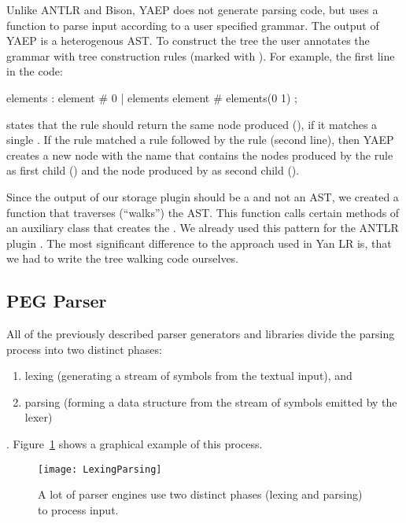 Unlike \gls{ANTLR} and Bison, \gls{YAEP} does not generate parsing code, but uses a function to parse input according to a user specified grammar. The output of YAEP is a heterogenous \gls{AST}. To construct the tree the user annotates the grammar with tree construction rules (marked with \code{\#}). For example, the first line in the code:

\begin{shellcode}
elements : element          # 0
         | elements element # elements(0 1)
         ;
\end{shellcode}

states that the rule  should return the same node  produced (), if it matches a single . If the rule  matched a rule  followed by the rule  (second line), then YAEP creates a new node with the name  that contains the nodes produced by the rule  as first child () and the node produced by  as second child ().

Since the output of our storage plugin \LinkYAwn{} should be a  and not an \gls{AST}, we created a function that traverses (“walks”) the \gls{AST}. This function calls certain methods of an auxiliary class  that creates the . We already used this pattern for the \gls{ANTLR} plugin \LinkYanLR{}. The most significant difference to the approach used in Yan LR is, that we had to write the tree walking code ourselves.

\subsection{PEG Parser}
\label{sec:peg_parser}

All of the previously described parser generators and libraries divide the parsing process into two distinct phases:

\begin{enumerate}
  \item lexing (generating a stream of symbols from the textual input), and
  \item parsing (forming a data structure from the stream of symbols emitted by the lexer)
\end{enumerate}

. Figure~\ref{fig:lexing_parsing} shows a graphical example of this process.

\begin{figure}
  \centering
    \texttt{[image: LexingParsing]}
  \caption{A lot of parser engines use two distinct phases (lexing and parsing) to process input.}
  \label{fig:lexing_parsing}
\end{figure}

